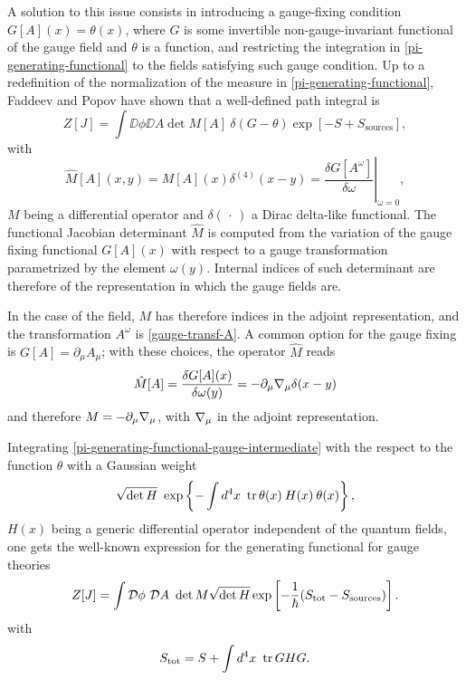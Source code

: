 A solution to this issue consists in introducing a gauge-fixing condition $G[A](x)=\theta(x)$, where $G$ is some invertible non-gauge-invariant functional of the gauge field and $\theta$ is a function, and restricting the integration in \eqref{pi-generating-functional} to the fields satisfying such gauge condition. Up to a redefinition  of the normalization of the measure in \eqref{pi-generating-functional}, Faddeev and Popov have shown that a well-defined path integral is
\begin{equation}\label{pi-generating-functional-gauge-intermediate}
Z[J]
	=
\int  \DD{\phi} \DD{A} \det M[A] \: \delta(G-\theta)\exp\left[{-S +  S_{\text{sources}}} \right],
\end{equation}
with
\begin{equation}\label{gauge-fixing-jacobian}
\hat M[A](x,y) = M[A](x) \delta^{(4)}(x-y) = \left. \frac{\delta G[A^\omega] }{\delta \omega }\right|_{\omega=0} ,
\end{equation}
$M$ being a differential operator and $\delta(\, \cdot\,)$ a Dirac delta-like functional. The functional Jacobian determinant $\hat M$ is computed from the variation of the gauge fixing functional $G[A](x)$ with respect to a gauge transformation parametrized by the element $\omega(y)$. Internal indices of such determinant are therefore of the representation in which the gauge fields are.

In the case of the \ym{} field, $M$ has therefore indices in the adjoint representation, and the transformation $A^\omega$ is \eqref{gauge-transf-A}.
A common option for the gauge fixing is $G[A]=\partial_\mu A_\mu$; with these choices, the operator $\hat M$ reads 
\begin{equation}\label{M-lorenz-gauge}
\hat M[A] = \frac{\delta G[A](x)}{\delta \omega(y)} = - \partial_\mu { \mathcal{\nabla} }_\mu\delta(x-y) 
\end{equation}
and therefore $M = -\partial_\mu { \mathcal{\nabla} }_\mu$, with ${ \mathcal{\nabla} }_\mu$ in the adjoint representation.

Integrating \eqref{pi-generating-functional-gauge-intermediate} with the respect to the function $\theta$ with a Gaussian weight 
\begin{equation}
\sqrt{ \det H }\ \exp\left\lbrace -\int \dd{^4x} \tr \theta(x) \: H(x) \: \theta(x) \right\rbrace,
\end{equation}
$H(x)$ being a generic differential operator independent of the quantum fields, one gets the well-known expression for the generating functional for gauge theories
\begin{equation}\label{pi-generating-functional-gauge}
Z[J]
	=
\int  \mathcal{D}\phi\  \mathcal{D}A\ 
 \det M
 \sqrt{ \det H }
 \exp\left[{-\frac{1}{\hbar}( S_{ \text{tot} }  - { S_\text{sources} })}\right].
\end{equation}
with
\begin{equation}\label{Stot}
S_{ \text{tot} } = S + \int d^4 x\  \operatorname{tr} G H G.
\end{equation}


